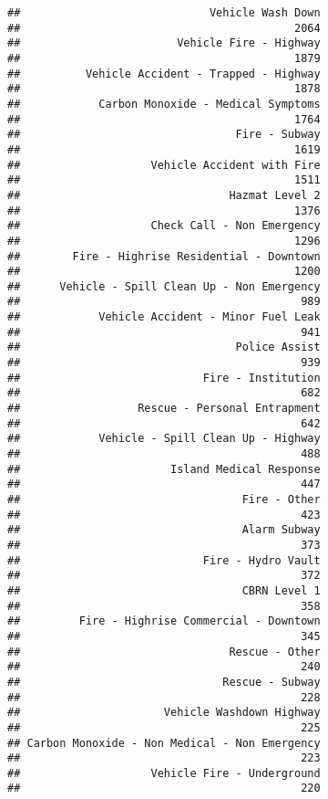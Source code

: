 \documentclass[]{article}
\begin{document}
\begin{verbatim}
##                             Vehicle Wash Down 
##                                          2064 
##                        Vehicle Fire - Highway 
##                                          1879 
##          Vehicle Accident - Trapped - Highway 
##                                          1878 
##            Carbon Monoxide - Medical Symptoms 
##                                          1764 
##                                 Fire - Subway 
##                                          1619 
##                    Vehicle Accident with Fire 
##                                          1511 
##                                Hazmat Level 2 
##                                          1376 
##                    Check Call - Non Emergency 
##                                          1296 
##        Fire - Highrise Residential - Downtown 
##                                          1200 
##      Vehicle - Spill Clean Up - Non Emergency 
##                                           989 
##            Vehicle Accident - Minor Fuel Leak 
##                                           941 
##                                 Police Assist 
##                                           939 
##                            Fire - Institution 
##                                           682 
##                  Rescue - Personal Entrapment 
##                                           642 
##            Vehicle - Spill Clean Up - Highway 
##                                           488 
##                       Island Medical Response 
##                                           447 
##                                  Fire - Other 
##                                           423 
##                                  Alarm Subway 
##                                           373 
##                            Fire - Hydro Vault 
##                                           372 
##                                  CBRN Level 1 
##                                           358 
##         Fire - Highrise Commercial - Downtown 
##                                           345 
##                                Rescue - Other 
##                                           240 
##                               Rescue - Subway 
##                                           228 
##                      Vehicle Washdown Highway 
##                                           225 
## Carbon Monoxide - Non Medical - Non Emergency 
##                                           223 
##                    Vehicle Fire - Underground 
##                                           220 

\end{verbatim}
\end{document}
